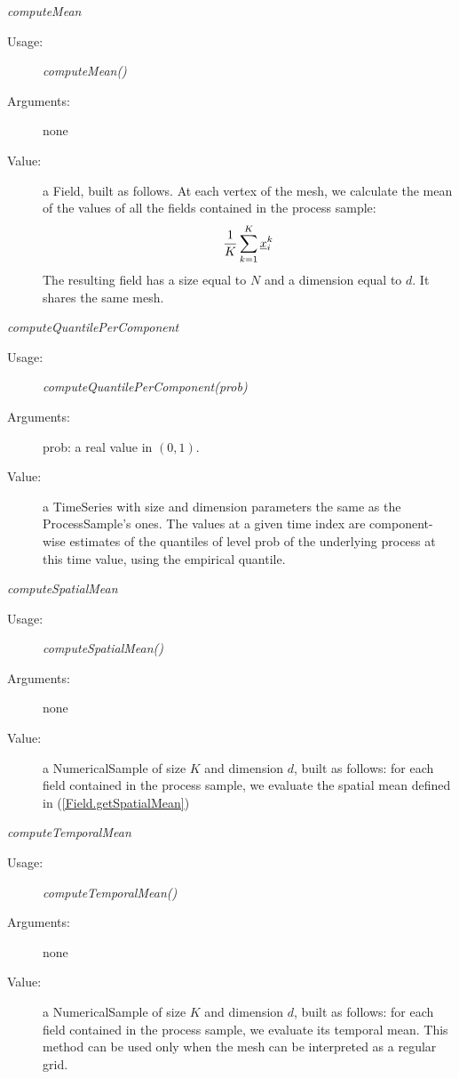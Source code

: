 \begin{description}
\begin{description}
\item \textit{computeMean}
\begin{description}
\item[Usage:] \textit{computeMean()}
\item[Arguments:] none
\item[Value:] a Field, built as follows. At each vertex of the mesh, we calculate the mean of  the values of all the fields contained in the process sample:
\begin{align}\label{meanProcessSample}
\displaystyle \frac{1}{K} \sum_{k=1}^K {\underline{x}}_i^k
\end{align}
The resulting field has a size equal to $N$ and a dimension equal to $d$. It shares the same mesh.


\end{description}
\bigskip

\item \textit{computeQuantilePerComponent}
\begin{description}
\item[Usage:] \textit{computeQuantilePerComponent(prob)}
\item[Arguments:] prob: a real value in $(0, 1)$.
\item[Value:] a TimeSeries with size and dimension parameters the same as the ProcessSample's ones. The values at a given time index are component-wise estimates of the quantiles of level prob of the underlying process at this time value, using the empirical quantile.
\end{description}
\bigskip

\item \textit{computeSpatialMean}
\begin{description}
\item[Usage:] \textit{computeSpatialMean()}
\item[Arguments:] none
\item[Value:] a NumericalSample of size $K$ and  dimension $d$, built as follows: for each field contained in the process sample, we evaluate the spatial mean defined in (\ref{Field.getSpatialMean})
\end{description}
\bigskip

\item \textit{computeTemporalMean}
\begin{description}
\item[Usage:] \textit{computeTemporalMean()}
\item[Arguments:] none
\item[Value:] a NumericalSample  of size $K$ and  dimension $d$, built as follows: for each field contained in the process sample, we evaluate its temporal mean. This method can be used only when the mesh can be interpreted as a regular grid.
\end{description}
\bigskip


\end{description}
\end{description}
